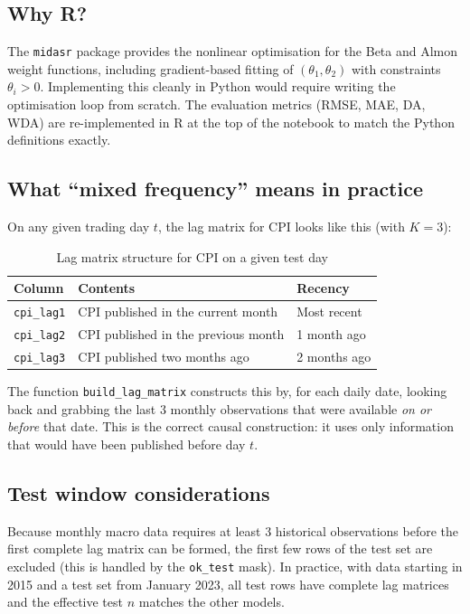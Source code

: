 \documentclass[12pt, a4paper]{article}
\begin{document}
\subsection{Why R?}

The \texttt{midasr} package provides the nonlinear optimisation for the Beta and Almon
weight functions, including gradient-based fitting of $(\theta_1, \theta_2)$ with
constraints $\theta_i > 0$. Implementing this cleanly in Python would require writing
the optimisation loop from scratch. The evaluation metrics (RMSE, MAE, DA, WDA) are
re-implemented in R at the top of the notebook to match the Python definitions exactly.

\subsection{What ``mixed frequency'' means in practice}

On any given trading day $t$, the lag matrix for CPI looks like this (with $K = 3$):

\begin{table}[H]
\centering
\caption{Lag matrix structure for CPI on a given test day}
\begin{tabular}{lll}
\toprule
Column & Contents & Recency \\
\midrule
\texttt{cpi\_lag1} & CPI published in the current month & Most recent \\
\texttt{cpi\_lag2} & CPI published in the previous month & 1 month ago \\
\texttt{cpi\_lag3} & CPI published two months ago & 2 months ago \\
\bottomrule
\end{tabular}
\end{table}

\noindent The function \texttt{build\_lag\_matrix} constructs this by, for each daily
date, looking back and grabbing the last 3 monthly observations that were available
\emph{on or before} that date. This is the correct causal construction: it uses only
information that would have been published before day $t$.

\subsection{Test window considerations}

Because monthly macro data requires at least 3 historical observations before the first
complete lag matrix can be formed, the first few rows of the test set are excluded
(this is handled by the \texttt{ok\_test} mask). In practice, with data starting in
2015 and a test set from January 2023, all test rows have complete lag matrices and the
effective test $n$ matches the other models.
\end{document}

